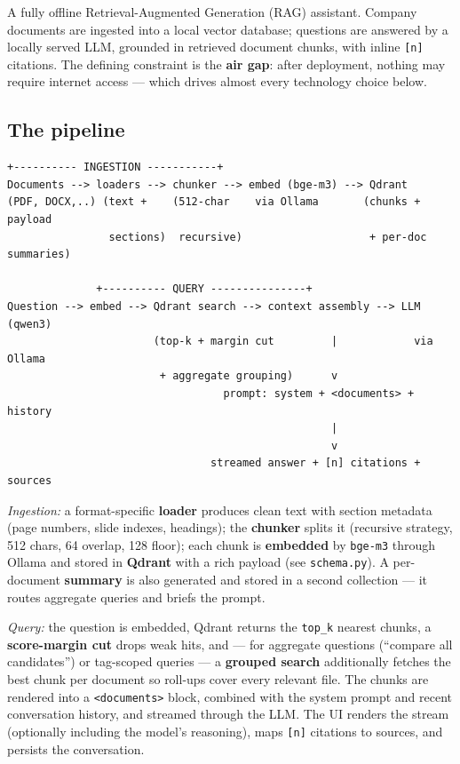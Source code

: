 \documentclass[11pt,letterpaper]{article}
\begin{document}
A fully offline Retrieval-Augmented Generation (RAG) assistant. Company
documents are ingested into a local vector database; questions are answered
by a locally served LLM, grounded in retrieved document chunks, with inline
\texttt{[n]} citations. The defining constraint is the \textbf{air gap}:
after deployment, nothing may require internet access --- which drives
almost every technology choice below.

\subsection{The pipeline}

\begin{lstlisting}[style=tree]
              +---------- INGESTION -----------+
Documents --> loaders --> chunker --> embed (bge-m3) --> Qdrant
(PDF, DOCX,..) (text +    (512-char    via Ollama       (chunks + payload
                sections)  recursive)                    + per-doc summaries)

              +---------- QUERY ---------------+
Question --> embed --> Qdrant search --> context assembly --> LLM (qwen3)
                       (top-k + margin cut         |            via Ollama
                        + aggregate grouping)      v
                                  prompt: system + <documents> + history
                                                   |
                                                   v
                                streamed answer + [n] citations + sources
\end{lstlisting}

\emph{Ingestion:} a format-specific \textbf{loader} produces clean text with
section metadata (page numbers, slide indexes, headings); the
\textbf{chunker} splits it (recursive strategy, 512 chars, 64 overlap, 128
floor); each chunk is \textbf{embedded} by \texttt{bge-m3} through Ollama
and stored in \textbf{Qdrant} with a rich payload (see
\texttt{schema.py}). A per-document \textbf{summary} is also generated and
stored in a second collection --- it routes aggregate queries and briefs the
prompt.

\emph{Query:} the question is embedded, Qdrant returns the \texttt{top\_k}
nearest chunks, a \textbf{score-margin cut} drops weak hits, and --- for
aggregate questions (``compare all candidates'') or tag-scoped queries ---
a \textbf{grouped search} additionally fetches the best chunk per document
so roll-ups cover every relevant file. The chunks are rendered into a
\texttt{<documents>} block, combined with the system prompt and recent
conversation history, and streamed through the LLM. The UI renders the
stream (optionally including the model's reasoning), maps \texttt{[n]}
citations to sources, and persists the conversation.
\end{document}
